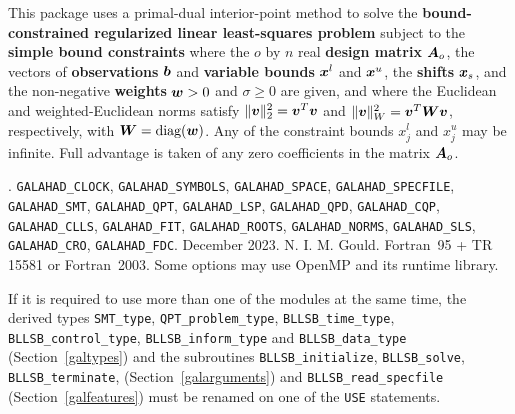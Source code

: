 \documentclass{galahad}
\newcommand{\packagename}{BLLSB}
\newcommand{\fullpackagename}{\libraryname\_\packagename}
\begin{document}
\galheader


\galsummary
This package uses a primal-dual interior-point method to solve the
{\bf bound-constrained regularized linear least-squares problem}
subject to the {\bf simple bound constraints}
where the $o$ by $n$ real {\bf design matrix} ${\bm{A}}_o$, the vectors 
of {\bf observations} ${\bm{b}}$ and 
{\bf variable bounds} ${\bm{x}}^{l}$ and ${\bm{x}}^{u}$, the {\bf shifts} ${\bm{x}}_s$, 
and the non-negative {\bf weights} ${\bm{w}} > 0$ and $\sigma \geq 0$ are given, 
and where the Euclidean and weighted-Euclidean norms
satisfy $\|{\bm{v}}\|_2^2 = {\bm{v}}^T {\bm{v}}$ and $\|{\bm{v}}\|_W^2 = {\bm{v}}^T {\bm{W}} {\bm{v}}$,
respectively, with ${\bm{W}} = \mbox{diag}({\bm{w}})$.
Any of the constraint bounds $x_{j}^{l}$ and $x_{j}^{u}$ may be infinite.
Full advantage is taken of any zero coefficients in the matrix ${\bm{A}}_o$.


\galattributes
\galversions{\tt  \fullpackagename\_single, \fullpackagename\_double}.
\galuses
{\tt GALAHAD\_CLOCK},
{\tt GALAHAD\_SY\-M\-BOLS},
{\tt GALAHAD\-\_SPACE},
{\tt GALAHAD\_SPECFILE},
{\tt GALAHAD\_SMT},
{\tt GALAHAD\_QPT},
{\tt GALAHAD\_LSP},
{\tt GALAHAD\_\-QPD},
{\tt GALAHAD\_\-CQP},
{\tt GALAHAD\_\-CLLS},
{\tt GALAHAD\_\-FIT},
{\tt GALAHAD\_\-ROOTS},
{\tt GALAHAD\_\-NORMS},
{\tt GALAHAD\_\-SLS},
{\tt GALAHAD\_\-CRO},
{\tt GALAHAD\_FDC}.
\galdate December 2023.
\galorigin N. I. M. Gould.
\gallanguage Fortran~95 + TR 15581 or Fortran~2003.
\galparallelism Some options may use OpenMP and its runtime library.


\galhowto




\noindent
If it is required to use more than one of the modules at the same time, 
the derived types
{\tt SMT\_type},
{\tt QPT\_problem\_type},
{\tt \packagename\_time\_type},
{\tt \packagename\_control\_type},
{\tt \packagename\_inform\_type}
and
{\tt \packagename\_data\_type}
(Section~\ref{galtypes})
and the subroutines
{\tt \packagename\_initialize},
{\tt \packagename\_\-solve},
{\tt \packagename\_terminate},
(Section~\ref{galarguments})
and
{\tt \packagename\_read\_specfile}
(Section~\ref{galfeatures})
must be renamed on one of the {\tt USE} statements.
\end{document}
